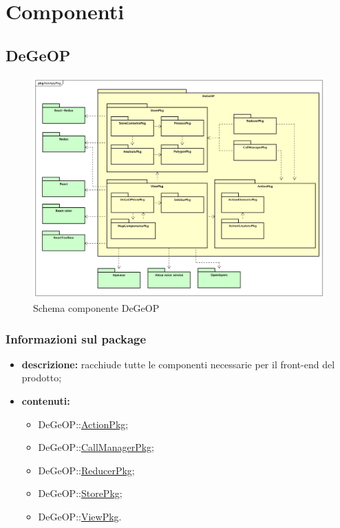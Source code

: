 \section{Componenti} \label{componenti}
\subsection{DeGeOP}
\label{pkg::DeGeOP}
\begin{figure}[H]
	\centering
	\includegraphics[width=\textwidth]{img/PkgDiagram/DeGeOPPkg.png}
	\caption{Schema componente DeGeOP}
\end{figure}
\subsubsection{Informazioni sul package}
\begin{itemize}
	\item \textbf{descrizione:} racchiude tutte le componenti necessarie per il front-end del prodotto;
	\item \textbf{ contenuti:}
	\begin{itemize}
		\item DeGeOP::\hyperref[pkg::ActionPkg]{ActionPkg};
		\item DeGeOP::\hyperref[pkg::CallManagerPkg]{CallManagerPkg};
		\item DeGeOP::\hyperref[pkg::ReducerPkg]{ReducerPkg};
		\item DeGeOP::\hyperref[pkg::StorePkg]{StorePkg};
		\item DeGeOP::\hyperref[pkg::ViewPkg]{ViewPkg}.
	\end{itemize}
\end{itemize}
\newpage
